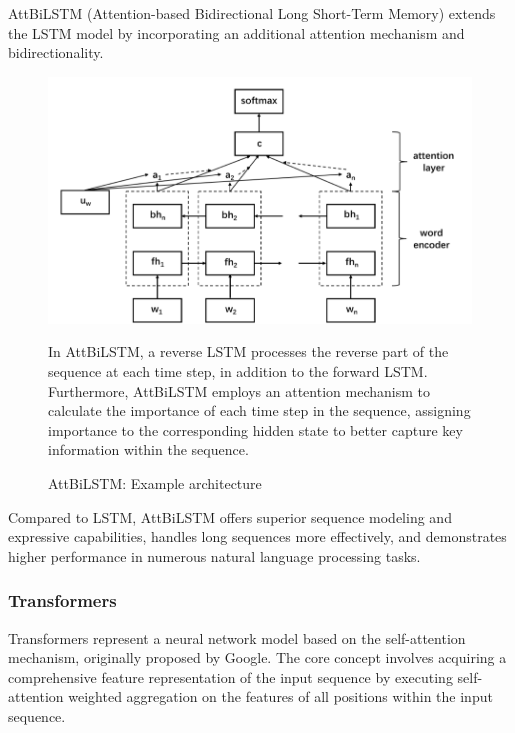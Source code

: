 \documentclass[a4paper]{article}
\begin{document}
AttBiLSTM (Attention-based Bidirectional Long Short-Term Memory) extends the LSTM model by incorporating an additional attention mechanism and bidirectionality.

\begin{figure}[H]
    \centering
    \begin{minipage}{0.48\textwidth}
        \centering
        \includegraphics[width=1\textwidth]{./images/AttBiLSTM_architecture.png}
        \caption{AttBiLSTM: Example architecture}
        \label{fig.AttBiLSTM[HEMOS: A novel deep learning-based fine-grained humor detecting method for sentiment analysis of social media]}
    \end{minipage}\hfill
    \begin{minipage}{0.48\textwidth}
        In AttBiLSTM, a reverse LSTM processes the reverse part of the sequence at each time step, in addition to the forward LSTM. Furthermore, AttBiLSTM employs an attention mechanism to calculate the importance of each time step in the sequence, assigning importance to the corresponding hidden state to better capture key information within the sequence.
    \end{minipage}
\end{figure}

Compared to LSTM, AttBiLSTM offers superior sequence modeling and expressive capabilities, handles long sequences more effectively, and demonstrates higher performance in numerous natural language processing tasks.

\subsubsection{Transformers}

Transformers represent a neural network model based on the self-attention mechanism, originally proposed by Google. The core concept involves acquiring a comprehensive feature representation of the input sequence by executing self-attention weighted aggregation on the features of all positions within the input sequence.
\end{document}
